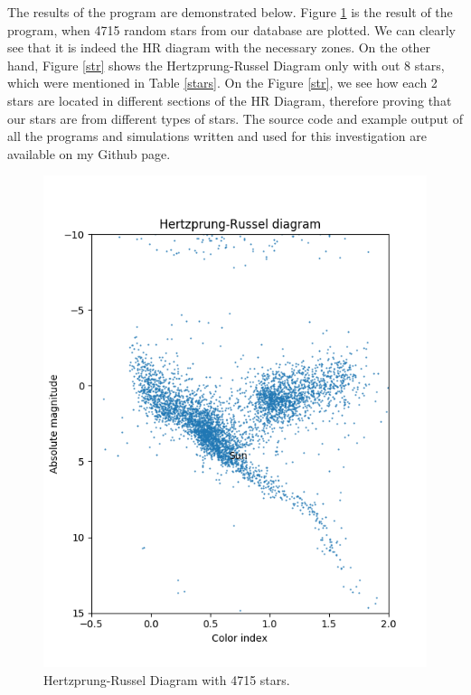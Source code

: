 \documentclass{IEEEtran}
\begin{document}
  The results of the program are demonstrated below. Figure \ref{full} is the result of the program, when 4715 random stars from our database are plotted. We can clearly see that it is indeed the HR diagram with the necessary zones. On the other hand, Figure \ref{str} shows the Hertzprung-Russel Diagram only with out 8 stars, which were mentioned in Table \ref{stars}. On the Figure \ref{str}, we see how each 2 stars are located in different sections of the HR Diagram, therefore proving that our stars are from different types of stars. The source code and example output of all the programs and simulations written and used for this investigation are available on my Github page.\cite{github}
  \begin{figure}[h]
    \centering
    \begin{minipage}[b]{0.24\textwidth}
      \includegraphics[width=\textwidth]{full.png}
      \caption{Hertzprung-Russel Diagram with 4715 stars.}
      \label{full}
    \end{minipage}
    \hfill
    \begin{minipage}[b]{0.24\textwidth}

\end{minipage}
\end{figure}
\end{document}
